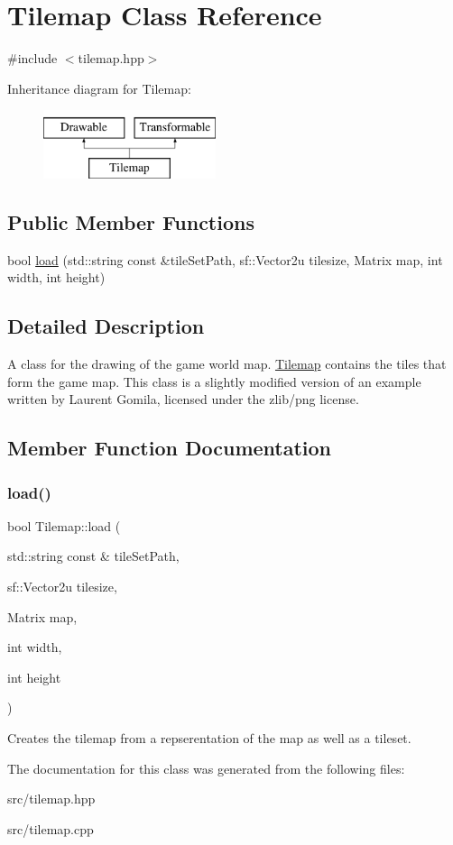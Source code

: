 \hypertarget{classTilemap}{}\section{Tilemap Class Reference}
\label{classTilemap}


{\ttfamily \#include $<$tilemap.\+hpp$>$}

Inheritance diagram for Tilemap\+:\begin{figure}[H]
\begin{center}
\leavevmode
\includegraphics[height=2.000000cm]{classTilemap}
\end{center}
\end{figure}
\subsection*{Public Member Functions}
\begin{DoxyCompactItemize}
\item 
bool \hyperlink{classTilemap_a43d8cf3e3bd41fdf5215423d8fa4c846}{load} (std\+::string const \&tile\+Set\+Path, sf\+::\+Vector2u tilesize, Matrix map, int width, int height)
\end{DoxyCompactItemize}


\subsection{Detailed Description}
A class for the drawing of the game world map. \hyperlink{classTilemap}{Tilemap} contains the tiles that form the game map. This class is a slightly modified version of an example written by Laurent Gomila, licensed under the zlib/png license. 

\subsection{Member Function Documentation}
\hypertarget{classTilemap_a43d8cf3e3bd41fdf5215423d8fa4c846}{}\label{classTilemap_a43d8cf3e3bd41fdf5215423d8fa4c846} 
\subsubsection{\texorpdfstring{load()}{load()}}
{\footnotesize\ttfamily bool Tilemap\+::load (\begin{DoxyParamCaption}\item[{std\+::string const \&}]{tile\+Set\+Path,  }\item[{sf\+::\+Vector2u}]{tilesize,  }\item[{Matrix}]{map,  }\item[{int}]{width,  }\item[{int}]{height }\end{DoxyParamCaption})}

Creates the tilemap from a repserentation of the map as well as a tileset. 

The documentation for this class was generated from the following files\+:\begin{DoxyCompactItemize}
\item 
src/tilemap.\+hpp\item 
src/tilemap.\+cpp\end{DoxyCompactItemize}
